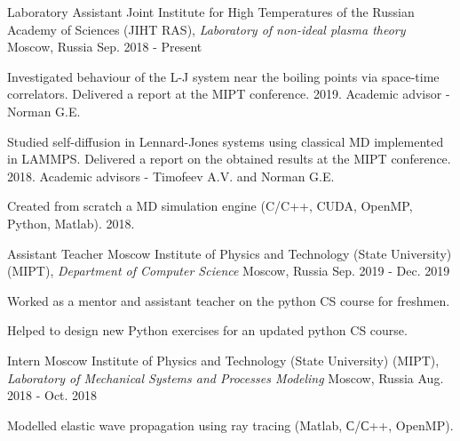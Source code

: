 

\begin{cventries}

  \cventry
    {Laboratory Assistant} %
    {Joint Institute for High Temperatures of the Russian Academy of Sciences (JIHT RAS), \textit{Laboratory of non-ideal plasma theory}} %
    {Moscow, Russia} %
    {Sep. 2018 - Present} %
    {
      \begin{cvitems} %
        \item {Investigated behaviour of the L-J system near the boiling points via space-time correlators. Delivered a report at the MIPT conference. 2019. Academic advisor - Norman G.E.}
      	\item {Studied self-diffusion in Lennard-Jones systems using classical MD implemented in LAMMPS. Delivered a report on the obtained results at the MIPT conference. 2018. Academic advisors - Timofeev A.V. and Norman G.E. }
      	\item {Created from scratch a MD simulation engine (C/C++, CUDA, OpenMP, Python, Matlab).  2018.}
      \end{cvitems}
    }

  \cventry
    {Assistant Teacher} %
    {Moscow Institute of Physics and Technology (State University) (MIPT), \newline \textit{Department of Computer Science}} %
    {Moscow, Russia} %
    {Sep. 2019 - Dec. 2019} %
    {
      \begin{cvitems} %
        \item {Worked as a mentor and assistant teacher on the python CS course for freshmen.}
        \item {Helped to design new Python exercises for an updated python CS course.}
      \end{cvitems}
    }

  \cventry
    {Intern} %
    {Moscow Institute of Physics and Technology (State University) (MIPT), \newline \textit{Laboratory of Mechanical Systems and Processes Modeling}} %
    {Moscow, Russia} %
    {Aug. 2018 - Oct. 2018} %
    {
      \begin{cvitems} %
        \item {Modelled elastic wave propagation using ray tracing (Matlab, С/С++, OpenMP).}
      \end{cvitems}
    }

\end{cventries}
